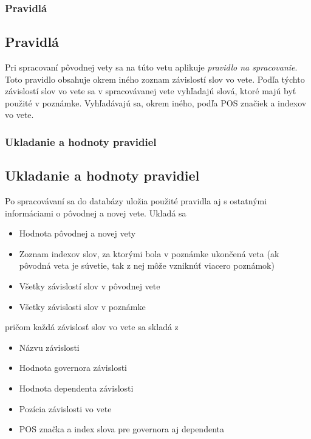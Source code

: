 %
%
{
	\subsubsection{Pravidlá}
}
{
	\subsection{Pravidlá}
}
\label{subsubsec:notenizer_pravidla}
Pri spracovaní pôvodnej vety sa na túto vetu aplikuje \textit{pravidlo na spracovanie}. Toto pravidlo obsahuje okrem iného zoznam závislostí slov vo vete. Podľa týchto závislostí slov vo vete sa v spracovávanej vete vyhľadajú slová, ktoré majú byť použité v poznámke. Vyhľadávajú sa, okrem iného, podľa POS značiek a indexov vo vete.

%
%
{
	\subsubsection{Ukladanie a hodnoty pravidiel}
}
{
	\subsection{Ukladanie a hodnoty pravidiel}
}
\label{subsubsec:notenizer_ukldanie_a_hodnoty_pravidiel}
Po spracovávaní sa do databázy uložia použité pravidla aj s ostatnými informáciami o pôvodnej a novej vete. Ukladá sa 
\begin{itemize}
	\item Hodnota pôvodnej a novej vety
	\item Zoznam indexov slov, za ktorými bola v poznámke ukončená veta (ak pôvodná veta je súvetie, tak z nej môže vzniknúť viacero poznámok)
	\item Všetky závislostí slov v pôvodnej vete
	\item Všetky závislosti slov v poznámke
\end{itemize}
pričom každá závislosť slov vo vete sa skladá z 
\begin{itemize}
	\item Názvu závislosti
	\item Hodnota governora závislosti
	\item Hodnota dependenta závislosti
	\item Pozícia závislosti vo vete
	\item POS značka a index slova pre governora aj dependenta
\end{itemize}

